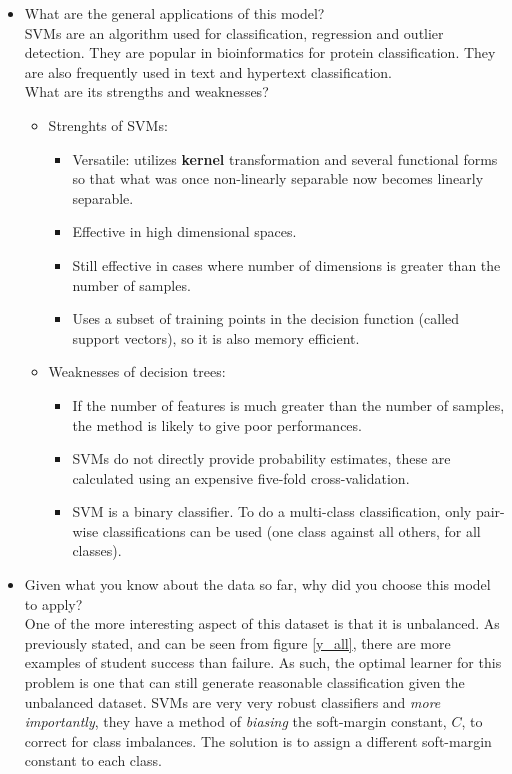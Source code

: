 \documentclass[12pt]{article}
\begin{document}
\begin{itemize}
\item What are the general applications of this model?\\ 
SVMs are an algorithm used for classification, regression and outlier detection. They are popular in bioinformatics for protein classification. They are also frequently used in text and hypertext classification. \\
What are its strengths and weaknesses?
\begin{itemize}
       \item Strenghts of SVMs:
              \begin{itemize}[noitemsep,nolistsep]
                     \item Versatile: utilizes \textbf{kernel} transformation and several functional forms so that what was once non-linearly separable now becomes linearly separable.
                     \item Effective in high dimensional spaces.
                     \item Still effective in cases where number of dimensions is greater than the number of samples.
                     \item Uses a subset of training points in the decision function (called support vectors), so it is also memory efficient.
              \end{itemize}
       \item Weaknesses of decision trees:
              \begin{itemize}[noitemsep,nolistsep]
                     \item If the number of features is much greater than the number of samples, the method is likely to give poor performances.
                     \item SVMs do not directly provide probability estimates, these are calculated using an expensive five-fold cross-validation.
                     \item SVM is a binary classifier. To do a multi-class classification, only pair-wise classifications can be used (one class against all others, for all classes).
              \end{itemize}
       \end{itemize}

\item Given what you know about the data so far, why did you choose this model to apply?\\
One of the more interesting aspect of this dataset is that it is unbalanced. As previously stated, and can be seen from figure \ref{y_all}, there are more examples of student success than failure. As such, the optimal learner for this problem is one that can still generate reasonable classification given the unbalanced dataset. SVMs are very very robust classifiers and \textit{more importantly}, they have a method of \textit{biasing} the soft-margin constant, $C$, to correct for class imbalances. The solution is to assign a different soft-margin constant to each class.

\end{itemize}
\end{document}

